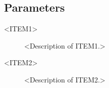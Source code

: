 
\subsection{Parameters}

\begin{description}

\item [<ITEM1>] <Description of ITEM1.>

\item [<ITEM2>] <Description of ITEM2.>

\end{description}








